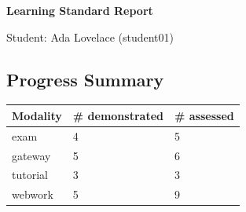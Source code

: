 \documentclass[10pt,letterpaper]{article}
\begin{document}
\setcounter{page}{1}
{\Large \centering \textbf{Learning Standard Report}\par}
\medskip
\noindent Student: Ada Lovelace (student01)
\subsection*{Progress Summary}
\begin{tabularx}{\textwidth}{||X|l|l||}
\toprule
\textbf{Modality} & \textbf{\# demonstrated} & \textbf{\# assessed} \\ \midrule \midrule
exam & 4 & 5 \\ \midrule
gateway & 5 & 6 \\ \midrule
tutorial & 3 & 3 \\ \midrule
webwork & 5 & 9 \\ \midrule
\bottomrule
\end{tabularx}
\end{document}
